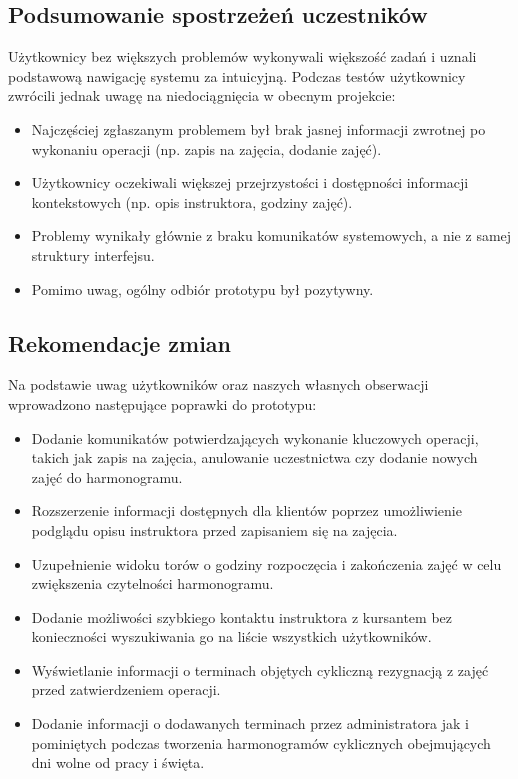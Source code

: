 \documentclass[a4paper,12pt]{article}
\begin{document}
\subsection{Podsumowanie spostrzeżeń uczestników}
 
Użytkownicy bez większych problemów wykonywali większość zadań i uznali podstawową nawigację systemu za intuicyjną. Podczas testów użytkownicy zwrócili jednak uwagę na niedociągnięcia w obecnym projekcie:
 
\begin{itemize}
    \item Najczęściej zgłaszanym problemem był brak jasnej informacji zwrotnej po wykonaniu operacji (np. zapis na zajęcia, dodanie zajęć).
    \item Użytkownicy oczekiwali większej przejrzystości i dostępności informacji kontekstowych (np. opis instruktora, godziny zajęć).
    \item Problemy wynikały głównie z braku komunikatów systemowych, a nie z samej struktury interfejsu.
    \item Pomimo uwag, ogólny odbiór prototypu był pozytywny.
\end{itemize}
 
\subsection{Rekomendacje zmian}
 
Na podstawie uwag użytkowników oraz naszych własnych obserwacji wprowadzono następujące poprawki do prototypu:
 
\begin{itemize}
    \item Dodanie komunikatów potwierdzających wykonanie kluczowych operacji, takich jak zapis na zajęcia, anulowanie uczestnictwa czy dodanie nowych zajęć do harmonogramu.
    \item Rozszerzenie informacji dostępnych dla klientów poprzez umożliwienie podglądu opisu instruktora przed zapisaniem się na zajęcia.
    \item Uzupełnienie widoku torów o godziny rozpoczęcia i zakończenia zajęć w celu zwiększenia czytelności harmonogramu.
    \item Dodanie możliwości szybkiego kontaktu instruktora z kursantem bez konieczności wyszukiwania go na liście wszystkich użytkowników.
    \item Wyświetlanie informacji o terminach objętych cykliczną rezygnacją z zajęć przed zatwierdzeniem operacji.
    \item Dodanie informacji o dodawanych terminach przez administratora jak i pominiętych podczas tworzenia harmonogramów cyklicznych obejmujących dni wolne od pracy i święta.
\end{itemize}
 
\end{document}
